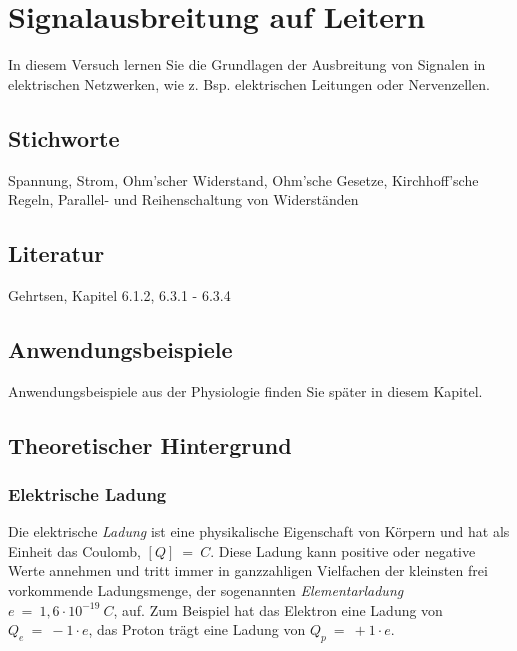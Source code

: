 \chapter{Signalausbreitung auf Leitern}
\label{vn:1}

In diesem Versuch lernen Sie die Grundlagen der Ausbreitung von Signalen in elektrischen Netzwerken, wie z. Bsp. elektrischen Leitungen oder Nervenzellen.


\section{Stichworte}
Spannung, Strom, Ohm'scher Widerstand, Ohm'sche Gesetze, Kirchhoff'sche Regeln, Parallel- und Reihenschaltung von Widerständen
%
\section{Literatur}
Gehrtsen, Kapitel 6.1.2, 6.3.1 - 6.3.4
%
\section{Anwendungsbeispiele}
%
Anwendungsbeispiele aus der Physiologie finden Sie später in diesem Kapitel.
%
\section{Theoretischer Hintergrund}

\subsection{Elektrische Ladung}

Die elektrische \textit{Ladung} ist eine physikalische Eigenschaft von Körpern und hat als Einheit das Coulomb, $ [Q]~=~C$. Diese Ladung kann positive oder negative Werte annehmen und tritt immer in ganzzahligen Vielfachen der kleinsten frei vorkommende Ladungsmenge, der sogenannten \textit{Elementarladung} $e~=~1,6\cdot 10^{-19}~C$, auf. Zum Beispiel hat das Elektron eine Ladung von $Q_e~=~-1\cdot e$, das Proton trägt eine Ladung von $Q_p~=~+1\cdot e$.

